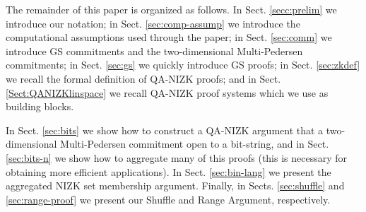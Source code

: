 The remainder of this paper is organized as follows. In Sect. \ref{secc:prelim} we introduce our notation; in Sect. \ref{sec:comp-assump} we introduce the computational assumptions used through the paper; in Sect. \ref{sec:comm} we introduce GS commitments and the two-dimensional Multi-Pedersen commitments; in Sect. \ref{sec:gs} we quickly introduce GS proofs; in Sect. \ref{sec:zkdef} we recall the formal definition of QA-NIZK proofs; and in Sect. \ref{Sect:QANIZKlinspace} we recall QA-NIZK proof systems which we use as building blocks.

In Sect. \ref{sec:bits} we show how to construct a QA-NIZK argument that a two-dimensional Multi-Pedersen commitment open to a bit-string, and in Sect. \ref{sec:bits-n} we show how to aggregate many of this proofs (this is necessary for obtaining more efficient applications).
In Sect. \ref{sec:bin-lang} we present the aggregated NIZK set membership argument. Finally, in Sects. \ref{sec:shuffle} and \ref{sec:range-proof} we present our Shuffle and Range Argument, respectively.
